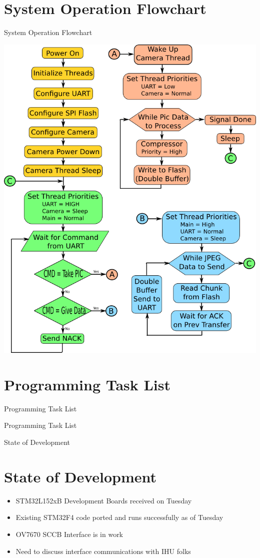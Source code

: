 \documentclass{beamer}
\begin{document}
\section{System Operation Flowchart}
\begin{frame}{System Operation Flowchart}
	\begin{center}
        \includegraphics[scale=0.30]{flow_chart.png}
	\end{center}
\end{frame}

\section{Programming Task List}
\begin{frame}{Programming Task List}
	\begin{center}
		\large{Programming Task List}
	\end{center}
\end{frame}


\begin{frame}{State of Development}
\section{State of Development}
		\begin{itemize}
			\item STM32L152xB Development Boards received on Tuesday
			\item Existing STM32F4 code ported and runs successfully as of Tuesday
			\item OV7670 SCCB Interface is in work
			\item Need to discuss interface communications with IHU folks
		\end{itemize}
\end{frame}
\end{document}
